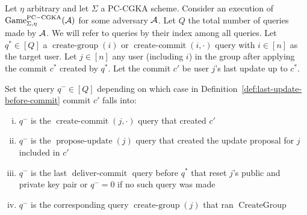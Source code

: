 \begin{definition} \label{def:safe-commit-wrt-user}
	Let $\eta$ arbitrary and let $\Sigma$ a PC-CGKA scheme. Consider an execution of $\mathrm{Game}_{\Sigma, \eta}^{\mathrm{PC-CGKA}}(\mathcal{A})$ for some adversary $\mathcal{A}$. Let $Q$ the total number of queries made by $\mathcal{A}$. We will refer to queries by their index among all queries. Let $q^* \in [Q]$ a $\operatorname{create-group}(i)$ or $\operatorname{create-commit}(i, \cdot)$ query with $i \in [n]$ as the target user. Let $j \in [n]$ any user (including $i$) in the group after applying the commit $c^*$ created by $q^*$. Let the commit $c'$ be user $j$'s last update up to $c^*$.

	Set the query $q^- \in [Q]$ depending on which case in Definition~\ref{def:last-update-before-commit} commit $c'$ falls into:
	\begin{enumerate}[(i)]
		\item $q^-$ is the $\operatorname{create-commit}(j, \cdot)$ query that created $c'$
		\item $q^-$ is the $\operatorname{propose-update}(j)$ query that created the update proposal for $j$ included in $c'$
		\item $q^-$ is the last $\operatorname{deliver-commit}$ query before $q^*$ that reset $j$'s public and private key pair or $q^- = 0$ if no such query was made
		\item $q^-$ is the corresponding query $\operatorname{create-group}(j)$ that ran $\operatorname{CreateGroup}$
	\end{enumerate}



\end{definition}
